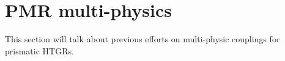 \section{PMR multi-physics}

This section will talk about previous efforts on multi-physic couplings for prismatic HTGRs.